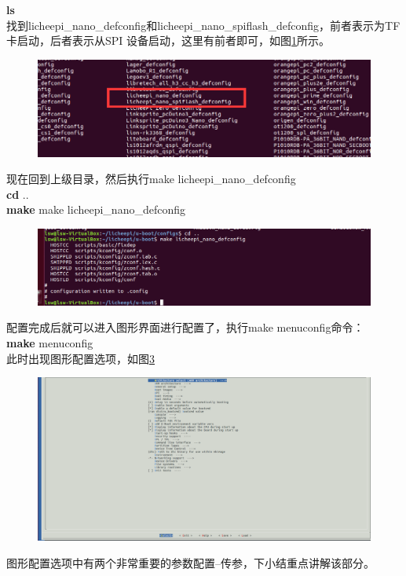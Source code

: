 \textbf{ls}        \\
找到licheepi\_nano\_defconfig和licheepi\_nano\_spiflash\_defconfig，前者表示为TF卡启动，后者表示从SPI
设备启动，这里有前者即可，如图\ref{fig:chapter1-2-4}所示。
\begin{figure}[htbp]
	\centering
	\includegraphics[width=1 \linewidth]{chapter2/img/chapter2-2-4}
	\caption{}
	\label{fig:chapter1-2-4}
\end{figure}
现在回到上级目录，然后执行make licheepi\_nano\_defconfig \\
\textbf{cd }.. \\
\textbf{make} make licheepi\_nano\_defconfig  \\
\begin{figure}[htbp]
	\centering
	\includegraphics[width=1 \linewidth]{chapter2/img/chapter2-2-5}
	\caption{}
	\label{fig:chapter1-2-5}
\end{figure}
配置完成后就可以进入图形界面进行配置了，执行make menuconfig命令：\\
\textbf{make} menuconfig   \\
此时出现图形配置选项，如图\ref{fig:chapter2-2-6}
\begin{figure}[htbp]
	\centering
	\includegraphics[width=1\linewidth]{chapter2/img/chapter2-2-6}
	\caption{}
	\label{fig:chapter2-2-6}
\end{figure}
图形配置选项中有两个非常重要的参数配置--传参，下小结重点讲解该部分。
